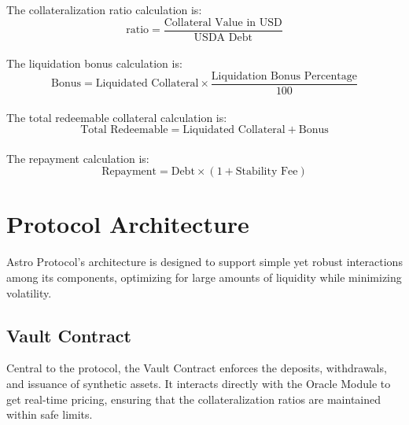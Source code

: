 The collateralization ratio calculation is:
\[
\text{ratio} = \frac{\text{Collateral Value in USD}}{\text{USDA Debt}}
\]\\

The liquidation bonus calculation is:
\[
\text{Bonus} = \text{Liquidated Collateral} \times \frac{\text{Liquidation Bonus Percentage}}{100}
\]\\

The total redeemable collateral calculation is:
\[
\text{Total Redeemable} = \text{Liquidated Collateral} + \text{Bonus}
\]\\

The repayment calculation is:
\[
\text{Repayment} = \text{Debt} \times (1 + \text{Stability Fee})
\]

\newpage
\section{Protocol Architecture}
Astro Protocol's architecture is designed to support simple yet robust interactions among its components, optimizing for large amounts of liquidity  while minimizing volatility.

\subsection{Vault Contract}
Central to the protocol, the Vault Contract enforces the deposits, withdrawals, and issuance of synthetic assets. It interacts directly with the Oracle Module to get real-time pricing, ensuring that the collateralization ratios are maintained within safe limits.

